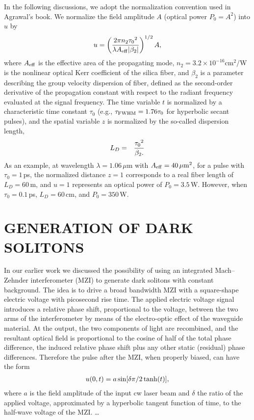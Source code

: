 In the following discussions, we adopt the normalization convention used in
Agrawal's book.\cite{AB} We normalize the field amplitude $A$ (optical
power $P_0 = A^2 $) into $u$ by
\begin{eqnarray*}
u = \left( { 2 \pi n_2 {\tau_0}^2 }\over
{ \lambda A_{\rm eff} | \beta_2 | } \right)^{1/2} A ,
\end{eqnarray*}
where $A_{\rm eff }$ is the effective area of the propagating mode, $n_2 =
3.2\times 10^{-16}$cm$^2 /$W is the nonlinear optical Kerr coefficient of
the silica fiber, and $ \beta_{2} $ is a parameter describing the group
velocity dispersion of fiber, defined as the second-order derivative of the
propagation constant with respect to the radiant frequency evaluated at the
signal frequency. The time variable $ t $ is normalized by a characteristic
time constant $ \tau_0 $ (e.g., $ \tau_{\rm FWHM}  =  1.76 \tau _{0} $ for
hyperbolic secant pulses), and the spatial variable $z$ is normalized by
the so-called dispersion length,
\begin{eqnarray*}
L_D  &=&  {{\tau_0}^2}\over{\beta_2 } .
\end{eqnarray*}
As an example, at wavelength $ \lambda  =  1.06 \, \mu$m with $ A_{\rm eff}
=  40\, \mu {\rm m}^2$, for a pulse with $ \tau _{0}  =  1\, $ps, the
normalized distance $z  =  1 $ corresponds to a real fiber length of $
L_{D}= 60\,$m, and $ u  =  1 $ represents an optical power of $
P_{0}=3.5\,$W.  However, when $ \tau _{0} =0.1\,$ps, $ L_{D }=60\,$cm, and
$ P_{0}=350\,$W.



\section{GENERATION OF DARK SOLITONS}
\label{GDS}
In our earlier work\cite{ZBD,ZBE} we discussed the possibility of using an
integrated Mach--Zehnder interferometer (MZI) to generate dark solitons
with constant background.  The idea is to drive a broad bandwidth MZI with
a square-shape electric voltage with picosecond rise time.  The applied
electric voltage signal introduces a relative phase shift, proportional to
the voltage, between the two arms of the interferometer by means of the
electro-optic effect of the waveguide material.   At the output,  the two
components of light are recombined, and the resultant optical field is
proportional to the cosine of half of the total phase difference, the
induced relative phase shift plus any other static (residual) phase
differences. Therefore the pulse after the MZI, when properly biased, can
have the form
\begin{eqnarray}
u (0,t)  =  a\, {\rm sin} [ \delta \pi /2\, {\rm tanh} (t) ],
\label{E1}
\end{eqnarray}
where $a$ is the field amplitude of the input cw laser beam and  $ \delta $
the ratio of the applied voltage, approximated by a hyperbolic tangent
function of time,  to the half-wave voltage of the MZI.
\ldots

